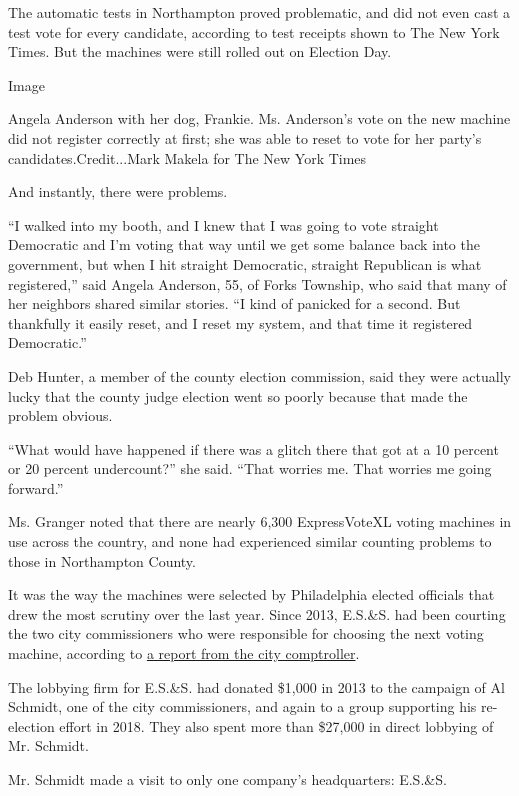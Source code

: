 The automatic tests in Northampton proved problematic, and did not even
cast a test vote for every candidate, according to test receipts shown
to The New York Times. But the machines were still rolled out on
Election Day.

Image

Angela Anderson with her dog, Frankie. Ms. Anderson's vote on the new
machine did not register correctly at first; she was able to reset to
vote for her party's candidates.Credit...Mark Makela for The New York
Times

And instantly, there were problems.

``I walked into my booth, and I knew that I was going to vote straight
Democratic and I'm voting that way until we get some balance back into
the government, but when I hit straight Democratic, straight Republican
is what registered,'' said Angela Anderson, 55, of Forks Township, who
said that many of her neighbors shared similar stories. ``I kind of
panicked for a second. But thankfully it easily reset, and I reset my
system, and that time it registered Democratic.''

Deb Hunter, a member of the county election commission, said they were
actually lucky that the county judge election went so poorly because
that made the problem obvious.

``What would have happened if there was a glitch there that got at a 10
percent or 20 percent undercount?'' she said. ``That worries me. That
worries me going forward.''

Ms. Granger noted that there are nearly 6,300 ExpressVoteXL voting
machines in use across the country, and none had experienced similar
counting problems to those in Northampton County.

It was the way the machines were selected by Philadelphia elected
officials that drew the most scrutiny over the last year. Since 2013,
E.S.\&S. had been courting the two city commissioners who were
responsible for choosing the next voting machine, according to
\href{https://3og1cv1uvq3u3skase2jhb69-wpengine.netdna-ssl.com/wp-content/uploads/2019/09/VOTING-TECHNOLOGY-PROCUREMENT-INVESTIGATION-PUBLIC.pdf}{a
report from the city comptroller}.

The lobbying firm for E.S.\&S. had donated \$1,000 in 2013 to the
campaign of Al Schmidt, one of the city commissioners, and again to a
group supporting his re-election effort in 2018. They also spent more
than \$27,000 in direct lobbying of Mr. Schmidt.

Mr. Schmidt made a visit to only one company's headquarters: E.S.\&S.

